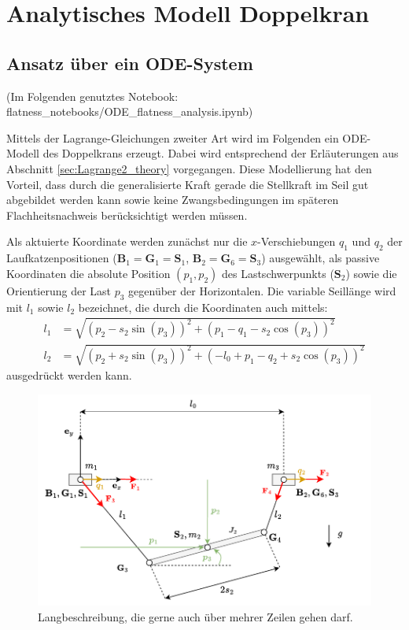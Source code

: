 \section{Analytisches Modell Doppelkran}

\subsection{Ansatz über ein ODE-System}
(Im Folgenden genutztes Notebook: flatness\_notebooks/ODE\_flatness\_analysis.ipynb)

Mittels der Lagrange-Gleichungen zweiter Art wird im Folgenden ein ODE-Modell des Doppelkrans erzeugt. Dabei wird entsprechend der Erläuterungen aus Abschnitt \ref{sec:Lagrange2_theory} vorgegangen. Diese Modellierung hat den Vorteil, dass durch die generalisierte Kraft gerade die Stellkraft im Seil gut abgebildet werden kann sowie keine Zwangsbedingungen im späteren Flachheitsnachweis berücksichtigt werden müssen.

Als aktuierte Koordinate werden zunächst nur die $x$-Verschiebungen $q_1$ und $q_2$ der Laufkatzenpositionen ($\mathbf{B}_1 = \mathbf{G}_1 = \mathbf{S}_1$, $\mathbf{B}_2 = \mathbf{G}_6 = \mathbf{S}_3$) ausgewählt, als passive Koordinaten die absolute Position $(p_1, p_2)$ des Lastschwerpunkts ($\mathbf{S}_2$) sowie die Orientierung der Last $p_3$ gegenüber der Horizontalen. Die variable Seillänge wird mit $l_1$ sowie $l_2$ bezeichnet, die durch die Koordinaten auch mittels:
\begin{align}
	l_1 &= \sqrt{\left(p_{2} - s_{2} \sin{\left(p_{3} \right)}\right)^{2} + \left(p_{1} - q_{1} - s_{2} \cos{\left(p_{3} \right)}\right)^{2}} \\
	l_2 &= \sqrt{\left(p_{2} + s_{2} \sin{\left(p_{3} \right)}\right)^{2} + \left(- l_{0} + p_{1} - q_{2} + s_{2} \cos{\left(p_{3} \right)}\right)^{2}}
\end{align}
ausgedrückt werden kann.

\begin{figure}[ht]
	\begin{center}
		\includegraphics[scale=1]{Pictures/ODE_flatness_analysis_double_crane_diagram}
	\end{center}
	\caption[Kurzbeschreibung für Abbildungsverzeichnis]
	{Langbeschreibung, die gerne auch über mehrer Zeilen gehen darf.}
	\label{fig:double_crane_diagram}
\end{figure}

